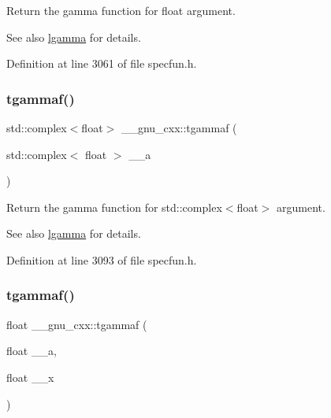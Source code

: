Return the gamma function for {\ttfamily  float } argument.

\begin{DoxySeeAlso}{See also}
\hyperlink{group__gnu__math__spec__func_ga40fa5127f7c419ed1d8f1c6a6f96ea9b}{lgamma} for details. 
\end{DoxySeeAlso}


Definition at line 3061 of file specfun.\+h.

\mbox{\label{group__gnu__math__spec__func_gaf548b80db1501cbc067de1564e721972}} 
\subsubsection{\texorpdfstring{tgammaf()}{tgammaf()}\hspace{0.1cm}{\footnotesize\ttfamily [2/3]}}
{\footnotesize\ttfamily std\+::complex$<$float$>$ \+\_\+\+\_\+gnu\+\_\+cxx\+::tgammaf (\begin{DoxyParamCaption}\item[{std\+::complex$<$ float $>$}]{\+\_\+\+\_\+a }\end{DoxyParamCaption})\hspace{0.3cm}{\ttfamily [inline]}}

Return the gamma function for {\ttfamily  std\+::complex$<$float$>$ } argument.

\begin{DoxySeeAlso}{See also}
\hyperlink{group__gnu__math__spec__func_ga40fa5127f7c419ed1d8f1c6a6f96ea9b}{lgamma} for details. 
\end{DoxySeeAlso}


Definition at line 3093 of file specfun.\+h.

\mbox{\label{group__gnu__math__spec__func_ga942773871e9c21a50cf13ec160e7e8d9}} 
\subsubsection{\texorpdfstring{tgammaf()}{tgammaf()}\hspace{0.1cm}{\footnotesize\ttfamily [3/3]}}
{\footnotesize\ttfamily float \+\_\+\+\_\+gnu\+\_\+cxx\+::tgammaf (\begin{DoxyParamCaption}\item[{float}]{\+\_\+\+\_\+a,  }\item[{float}]{\+\_\+\+\_\+x }\end{DoxyParamCaption})\hspace{0.3cm}{\ttfamily [inline]}}

